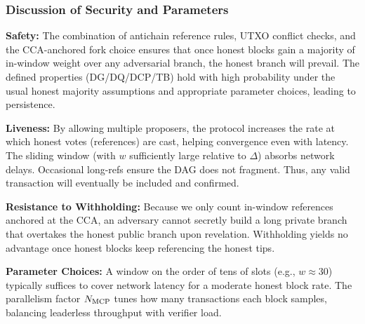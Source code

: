 \subsubsection{Discussion of Security and Parameters}
\noindent
\textbf{Safety:} The combination of antichain reference rules, UTXO conflict checks, and the CCA-anchored fork choice ensures that once honest blocks gain a majority of in-window weight over any adversarial branch, the honest branch will prevail. The defined properties (DG/DQ/DCP/TB) hold with high probability under the usual honest majority assumptions and appropriate parameter choices, leading to persistence.

\smallskip

\noindent
\textbf{Liveness:} By allowing multiple proposers, the protocol increases the rate at which honest votes (references) are cast, helping convergence even with latency. The sliding window (with $w$ sufficiently large relative to $\Delta$) absorbs network delays. Occasional long-refs ensure the DAG does not fragment. Thus, any valid transaction will eventually be included and confirmed.

\smallskip

\noindent
\textbf{Resistance to Withholding:} Because we only count in-window references anchored at the CCA, an adversary cannot secretly build a long private branch that overtakes the honest public branch upon revelation. Withholding yields no advantage once honest blocks keep referencing the honest tips.

\smallskip

\noindent
\textbf{Parameter Choices:} A window on the order of tens of slots (e.g., $w\approx 30$) typically suffices to cover network latency for a moderate honest block rate. The parallelism factor $N_{\mathrm{MCP}}$ tunes how many transactions each block samples, balancing leaderless throughput with verifier load.

